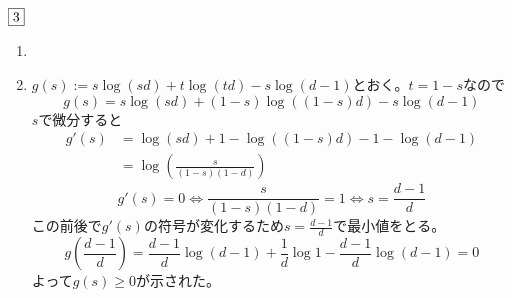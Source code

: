 \documentclass[dvipdfmx]{jsreport}
\begin{document}
\begin{souanswer} %
	$\fbox{3}$
\begin{enumerate}
	\item 
{}

	\item $g(s):= s\log{(sd)}+ t\log{(td)}- s\log{(d- 1)}$とおく。$t= 1- s$なので
\begin{equation*}
	g(s)= s\log{(sd)}+ (1- s)\log{((1- s)d)}- s\log{(d- 1)}
\end{equation*}
	$s$で微分すると
\begin{align*}
	g'(s)
	&= \log{(sd)}+ 1- \log{((1- s)d)}- 1- \log{(d- 1)}\\
	&= \log{\left(\frac{s}{(1- s)(1- d)}\right)}
\end{align*}
\begin{equation*}
	g'(s)= 0\iff \frac{s}{(1- s)(1- d)}= 1\iff s= \frac{d- 1}{d}
\end{equation*}
	この前後で$g'(s)$の符号が変化するため$s= \frac{d- 1}{d}$で最小値をとる。
\begin{equation*}
	g\left(\frac{d- 1}{d}\right)= \frac{d- 1}{d}\log{(d- 1)}+ \frac{1}{d}\log{1}- \frac{d- 1}{d}\log{(d- 1)}= 0
\end{equation*}
	よって$g(s)\ge 0$が示された。


\end{enumerate}
\end{souanswer}
\end{document}
